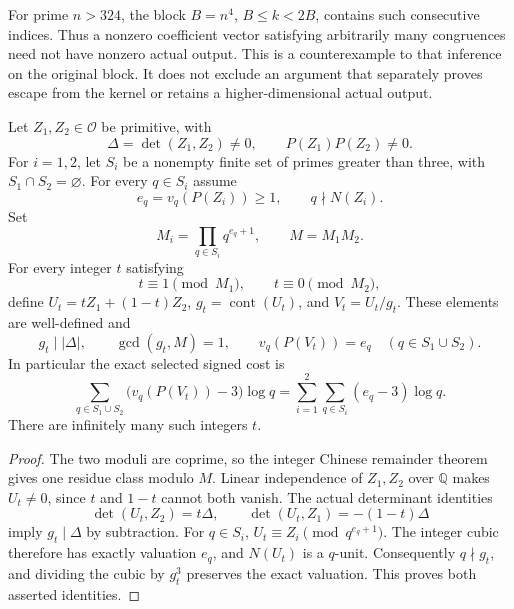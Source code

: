For prime \(n>324\), the block \(B=n^4\), \(B\le k<2B\), contains
such consecutive indices. Thus a nonzero coefficient vector satisfying
arbitrarily many congruences need not have nonzero actual output.
This is a counterexample to that inference on the original block.
It does not exclude an argument that separately proves escape from
the kernel or retains a higher-dimensional actual output.

\begin{theorem}
\label{lm-exact-selector}
Let \(Z_1,Z_2\in\mathcal O\) be primitive, with
\[
 \Delta=\det(Z_1,Z_2)\ne0,\qquad P(Z_1)P(Z_2)\ne0.
\]
For \(i=1,2\), let \(S_i\) be a nonempty finite set of primes
greater than three, with \(S_1\cap S_2=\varnothing\). For every
\(q\in S_i\) assume
\[
 e_q=v_q(P(Z_i))\ge1,\qquad q\nmid N(Z_i).
\]
Set
\[
 M_i=\prod_{q\in S_i}q^{e_q+1},\qquad M=M_1M_2.
\]
For every integer \(t\) satisfying
\begin{equation}
 t\equiv1\pmod {M_1},\qquad t\equiv0\pmod {M_2},
 \label{lm-selector-crt}
\end{equation}
define \(U_t=tZ_1+(1-t)Z_2\), \(g_t=\operatorname{cont}(U_t)\),
and \(V_t=U_t/g_t\). These elements are well-defined and
\begin{equation}
 g_t\mid |\Delta|,\qquad \gcd(g_t,M)=1,\qquad
 v_q(P(V_t))=e_q\quad(q\in S_1\cup S_2).
 \label{lm-content-and-depth}
\end{equation}
In particular the exact selected signed cost is
\begin{equation}
 \sum_{q\in S_1\cup S_2}\bigl(v_q(P(V_t))-3\bigr)\log q
   =\sum_{i=1}^2\sum_{q\in S_i}(e_q-3)\log q.
 \label{lm-selected-signed}
\end{equation}
There are infinitely many such integers \(t\).
\end{theorem}
\begin{proof}
The two moduli are coprime, so the integer Chinese remainder theorem
gives one residue class modulo \(M\). Linear independence of
\(Z_1,Z_2\) over \(\mathbb Q\) makes \(U_t\ne0\), since \(t\)
and \(1-t\) cannot both vanish. The actual determinant identities
\[
 \det(U_t,Z_2)=t\Delta,\qquad
 \det(U_t,Z_1)=-(1-t)\Delta
\]
imply \(g_t\mid\Delta\) by subtraction. For \(q\in S_i\),
\(U_t\equiv Z_i\pmod {q^{e_q+1}}\). The integer cubic therefore
has exactly valuation \(e_q\), and \(N(U_t)\) is a \(q\)-unit.
Consequently \(q\nmid g_t\), and dividing the cubic by \(g_t^3\)
preserves the exact valuation. This proves both asserted identities.
\end{proof}

